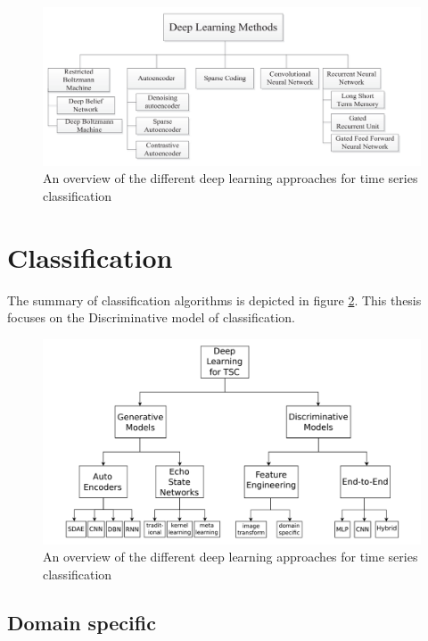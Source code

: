      \begin{figure}[h]
     	\centering
     	\includegraphics[width=1\linewidth]{images/dlm.png}
     	\caption{An overview of the different deep learning approaches for time series classification \cite{nweke2018deep}}
     	\label{l01}
     \end{figure}
     
     
     \section{Classification}
     The summary of classification algorithms is depicted in figure \ref{l0}. This thesis focuses on the Discriminative model of classification.
     
      \begin{figure}[h]
      	\centering
      	\includegraphics[width=1\linewidth]{images/tsc.png}
      	\caption{An overview of the different deep learning approaches for time series classification \cite{ismail2019deep}}
      	\label{l0}
      \end{figure}
     
     \subsection{Domain specific}
     
